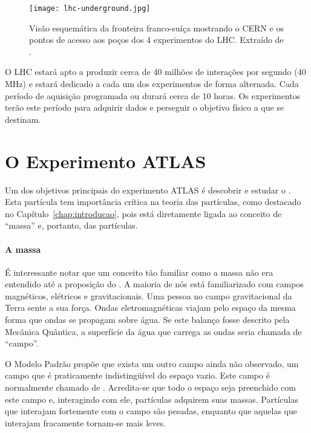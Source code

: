 \begin{figure}
\begin{center}
\texttt{[image: lhc-underground.jpg]}
\end{center}
\caption{Visão esquemática da fronteira franco-suíça mostrando o CERN e os
pontos de acesso aos poços dos 4 experimentos do LHC. Extraído de
\cite{cern}.}
\label{fig:aerial}
\end{figure}

O LHC estará apto a produzir cerca de 40 milhões de interações por segundo (40
MHz) e estará dedicado a cada um dos experimentos de forma alternada. Cada
período de aquisição programada ou  durará cerca de 10 horas. Os
experimentos terão este período para adquirir dados e perseguir o objetivo
físico a que se destinam.

\section{O Experimento ATLAS}

Um dos objetivos principais do experimento ATLAS é descobrir e estudar o
. Esta partícula tem importância crítica na teoria das
partículas, como destacado no Capítulo~\ref{chap:introducao}, pois está
diretamente ligada ao conceito de ``massa'' e,
portanto, das partículas.

\paragraph{A massa} É interessante notar que um conceito tão
familiar como a massa não era entendido até a proposição do . A maioria de nós está familiarizado com campos magnéticos, elétricos
e gravitacionais. Uma pessoa no campo gravitacional da Terra sente a sua
força. Ondas eletromagnéticas viajam pelo espaço da mesma forma que ondas se
propagam sobre água. Se este balanço fosse descrito pela Mecânica Quântica, a
superfície da água que carrega as ondas seria chamada de ``campo''.

O Modelo Padrão propõe que exista um outro campo ainda não observado, um campo
que é praticamente indistingüível do espaço vazio. Este campo é normalmente
chamado de . Acredita-se que todo o espaço seja preenchido
com este campo e, interagindo com ele, partículas adquirem suas
massas. Partículas que interajam fortemente com o campo são pesadas, enquanto
que aquelas que interajam fracamente tornam-se mais leves.

